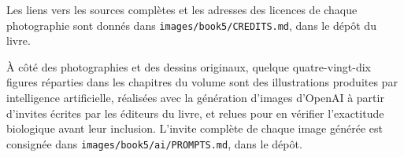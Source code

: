 Les liens vers les sources complètes et les adresses des licences de
chaque photographie sont donnés dans
\texttt{images/\allowbreak book5/\allowbreak CREDITS.md}, dans le dépôt du livre.

\bigskip
À côté des photographies et des dessins originaux, quelque
quatre-vingt-dix figures réparties dans les chapitres du volume
sont des illustrations produites par intelligence artificielle,
réalisées avec la génération d'images d'OpenAI à partir d'invites
écrites par les éditeurs du livre, et relues pour en vérifier
l'exactitude biologique avant leur inclusion. L'invite complète de chaque image générée est
consignée dans \texttt{images/\allowbreak book5/\allowbreak ai/\allowbreak PROMPTS.md},
dans le dépôt.
\par\endgroup
\clearpage
